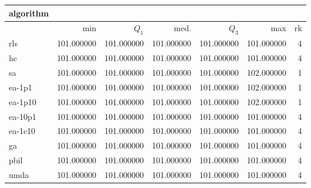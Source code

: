 \begin{tabular}{@{}l*{5}{>{{}}N{3}{0}}>{{}}N{2}{0}@{}}
\toprule
{algorithm} &  \\
\midrule
& {min} & {$Q_1$} & {med.} & {$Q_3$} & {max} & {rk}\\
\midrule
rls & {\color{blue}} 101.000000 & {\color{blue}} 101.000000 & {\color{blue}} 101.000000 & {\color{blue}} 101.000000 & 101.000000 & 4\\
hc & {\color{blue}} 101.000000 & {\color{blue}} 101.000000 & {\color{blue}} 101.000000 & {\color{blue}} 101.000000 & 101.000000 & 4\\
sa & {\color{blue}} 101.000000 & {\color{blue}} 101.000000 & {\color{blue}} 101.000000 & {\color{blue}} 101.000000 & {\color{blue}} 102.000000 & 1\\
ea-1p1 & {\color{blue}} 101.000000 & {\color{blue}} 101.000000 & {\color{blue}} 101.000000 & {\color{blue}} 101.000000 & {\color{blue}} 102.000000 & 1\\
ea-1p10 & {\color{blue}} 101.000000 & {\color{blue}} 101.000000 & {\color{blue}} 101.000000 & {\color{blue}} 101.000000 & {\color{blue}} 102.000000 & 1\\
ea-10p1 & {\color{blue}} 101.000000 & {\color{blue}} 101.000000 & {\color{blue}} 101.000000 & {\color{blue}} 101.000000 & 101.000000 & 4\\
ea-1c10 & {\color{blue}} 101.000000 & {\color{blue}} 101.000000 & {\color{blue}} 101.000000 & {\color{blue}} 101.000000 & 101.000000 & 4\\
ga & {\color{blue}} 101.000000 & {\color{blue}} 101.000000 & {\color{blue}} 101.000000 & {\color{blue}} 101.000000 & 101.000000 & 4\\
pbil & {\color{blue}} 101.000000 & {\color{blue}} 101.000000 & {\color{blue}} 101.000000 & {\color{blue}} 101.000000 & 101.000000 & 4\\
umda & {\color{blue}} 101.000000 & {\color{blue}} 101.000000 & {\color{blue}} 101.000000 & {\color{blue}} 101.000000 & 101.000000 & 4\\
\bottomrule
\end{tabular}

